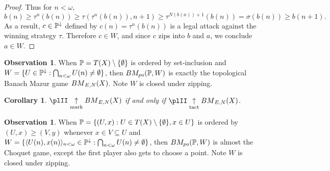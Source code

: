 \documentclass[11pt]{article}
\theoremstyle{plain}
\newtheorem{corollary}[theorem]{Corollary}
\theoremstyle{definition}
\newtheorem{observation}[theorem]{Observation}
\theoremstyle{remark}
\theoremstyle{plain}
\theoremstyle{definition}
\theoremstyle{remark}
\newcommand{\bmPoGame}[2]{BM_{po}(#1,#2)}
\begin{document}
\begin{proof}
    Thus for \(n<\omega\),
    \[
      b(n)
        \geq
      \tau^{n}(b(n))
        \geq
      \tau(\tau^{n}(b(n)),n+1)
        \geq
      \tau^{N(b(n))+1}(b(n))
        =
      \sigma(b(n))
        \geq
      b(n+1)
    .\]
    As a result, \(c\in\mathbb{P}^\downarrow\) defined by \(c(n)=\tau^n(b(n))\)
    is a legal attack against the winning strategy \(\tau\). Therefore
    \(c\in W\), and since \(c\) zips into \(b\) and \(a\), we conclude
    \(a\in W\).
  \end{proof}

  \begin{observation}
    When \(\mathbb{P}=T(X)\setminus\{\emptyset\}\) is ordered by set-inclusion
    and \(W=\{U\in\mathbb{P}^\downarrow:\bigcap_{n<\omega}U(n)\not=\emptyset\}\),
    then \(\bmPoGame{\mb P}{W}\) is exactly the topological Banach Mazur game
    \({BM}_{E,N}(X)\). Note \(W\) is closed under zipping.
  \end{observation}

  \begin{corollary}
  \(\plII\markwin\bmGame{X}\) if and only if
  \(\plII\tactwin\bmGame{X}\).
  \end{corollary}

  \begin{observation}
    When \(\mathbb{P}=\{(U,x):U\in T(X)\setminus\{\emptyset\},x\in U\}\)
    is ordered by \((U,x)\geq(V,y)\) whenever \(x\in V\subseteq U\)
    and \(W=\{\langle U(n),x(n)\rangle_{n<\omega}\in\mathbb{P}^\downarrow:\bigcap_{n<\omega}U(n)\not=\emptyset\}\),
    then \(\bmPoGame{\mb P}{W}\) is almost the Choquet game, except the first
    player also gets to choose a point. Note \(W\) is closed under zipping.
  \end{observation}

  
  
\end{document}
